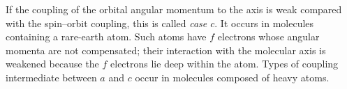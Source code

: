 If the coupling of the orbital angular momentum to the axis is weak compared with the spin--orbit coupling, this is called \emph{case $c$}. It occurs in molecules containing a rare-earth atom. Such atoms have $f$ electrons whose angular momenta are not compensated; their interaction with the molecular axis is weakened because the $f$ electrons lie deep within the atom. Types of coupling intermediate between $a$ and $c$ occur in molecules composed of heavy atoms.
